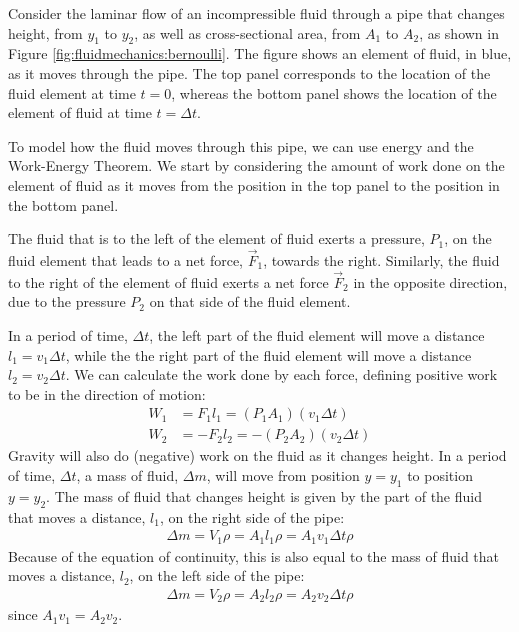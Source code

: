 {{Consider the laminar flow of an incompressible fluid through a pipe that changes height, from $y_1$ to $y_2$, as well as cross-sectional area, from $A_1$ to $A_2$, as shown in Figure \ref{fig:fluidmechanics:bernoulli}. The figure shows an element of fluid, in blue, as it moves through the pipe. The top panel corresponds to the location of the fluid element at time $t=0$, whereas the bottom panel shows the location of the element of fluid at time $t=\Delta t$.

To model how the fluid moves through this pipe, we can use energy and the Work-Energy Theorem. We start by considering the amount of work done on the element of fluid as it moves from the position in the top panel to the position in the bottom panel. 

The fluid that is to the left of the element of fluid exerts a pressure, $P_1$, on the fluid element that leads to a net force, $\vec F_1$, towards the right. Similarly, the fluid to the right of the element of fluid exerts a net force $\vec F_2$ in the opposite direction, due to the pressure $P_2$ on that side of the fluid element.

In a period of time, $\Delta t$, the left part of the fluid element will move a distance $l_1 = v_1 \Delta t$, while the the right part of the fluid element will move a distance $l_2=v_2\Delta t$. We can calculate the work done by each force, defining positive work to be in the direction of motion:
\begin{align*}
W_1 &=  F_1l_1 = (P_1A_1)(v_1 \Delta t)\\
W_2 &= -F_2l_2 = -(P_2A_2)(v_2 \Delta t)
\end{align*}
Gravity will also do (negative) work on the fluid as it changes height. In a period of time, $\Delta t$, a mass of fluid, $\Delta m$, will move from position $y=y_1$ to position $y=y_2$. The mass of fluid that changes height is given by the part of the fluid that moves a distance, $l_1$, on the right side of the pipe:
\begin{align*}
\Delta m = V_1 \rho = A_1 l_1 \rho = A_1 v_1 \Delta t \rho 
\end{align*}
Because of the equation of continuity, this is also equal to the mass of fluid that moves a distance, $l_2$, on the left side of the pipe:
\begin{align*}
\Delta m = V_2 \rho = A_2 l_2 \rho = A_2 v_2 \Delta t \rho 
\end{align*}
since $A_1v_1 = A_2 v_2$.

}}
